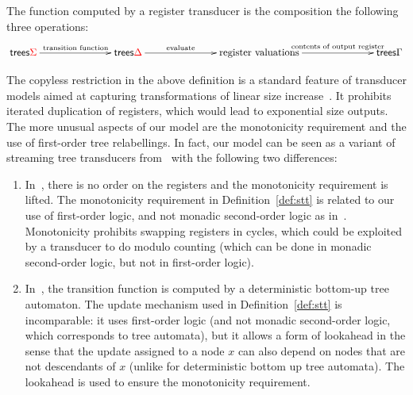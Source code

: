 The function computed by a register transducer is the composition the following three operations:
\begin{align*}
\xymatrix@C=2.5cm{
    \trees {\rSigma} \ar[r]^{\text{transition function}} & \trees {\rDelta} \ar[r]^-{
    \text{evaluate}
    } & \text{register valuations} \ar[r]^-{\text{contents of output register}} & \trees \Gamma
}
\end{align*}

The copyless restriction in the above definition is a standard feature of transducer models aimed at capturing transformations of linear size increase~\cite{alurStreamingStringTransducers2011,alur2017streaming}. It prohibits iterated duplication of registers, which would lead to exponential size outputs. The more unusual aspects of our model are the monotonicity requirement and the use of first-order tree relabellings. In fact, our model can be seen as a variant of  streaming tree transducers from~\cite{alur2017streaming} with the following two differences:
\begin{enumerate}
    \item  In~\cite{alur2017streaming}, there is no order on the registers and the monotonicity requirement is lifted. The monotonicity requirement in Definition~\ref{def:stt}  is related to our use of first-order logic, and not monadic second-order logic as in~\cite{alur2017streaming}. Monotonicity    prohibits swapping registers in cycles, which could be exploited by a transducer to do modulo counting (which can be done in monadic second-order logic, but not in first-order logic).
    \item In~\cite{alur2017streaming}, the transition function is computed by a deterministic bottom-up tree automaton. The update mechanism used in Definition~\ref{def:stt} is incomparable: it  uses first-order logic (and not monadic second-order logic, which corresponds to  tree automata), but it allows a form of lookahead in the sense that the update assigned to a node $x$ can also depend on nodes that are not descendants of $x$ (unlike for deterministic bottom up tree automata).  The lookahead is used to ensure the monotonicity requirement. 
\end{enumerate}


